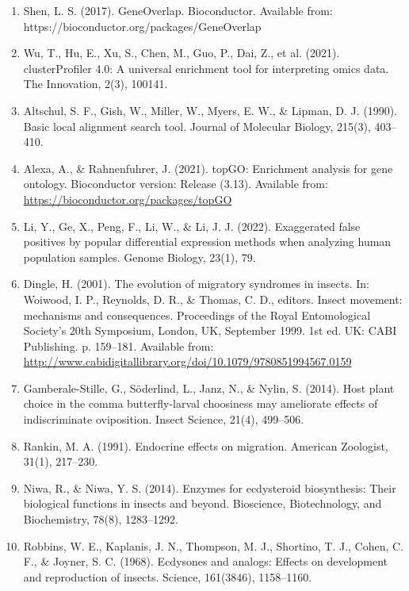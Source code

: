 \documentclass[lineno]{wiley-article}
\begin{document}
\begin{enumerate}
\item Shen, L. S. (2017). GeneOverlap. Bioconductor. Available from: https://bioconductor.org/packages/GeneOverlap

\item Wu, T., Hu, E., Xu, S., Chen, M., Guo, P., Dai, Z., et al. (2021). clusterProfiler 4.0: A universal enrichment tool for interpreting omics data. The Innovation, 2(3), 100141.

\item Altschul, S. F., Gish, W., Miller, W., Myers, E. W., \& Lipman, D. J. (1990). Basic local alignment search tool. Journal of Molecular Biology, 215(3), 403–410.

\item Alexa, A., \& Rahnenfuhrer, J. (2021). topGO: Enrichment analysis for gene ontology. Bioconductor version: Release (3.13). Available from: \url{https://bioconductor.org/packages/topGO}

\item Li, Y., Ge, X., Peng, F., Li, W., \& Li, J. J. (2022). Exaggerated false positives by popular differential expression methods when analyzing human population samples. Genome Biology, 23(1), 79.

\item Dingle, H. (2001). The evolution of migratory syndromes in insects. In: Woiwood, I. P., Reynolds, D. R., \& Thomas, C. D., editors. Insect movement: mechanisms and consequences. Proceedings of the Royal Entomological Society’s 20th Symposium, London, UK, September 1999. 1st ed. UK: CABI Publishing. p. 159–181. Available from: \url{http://www.cabidigitallibrary.org/doi/10.1079/9780851994567.0159}

\item Gamberale-Stille, G., Söderlind, L., Janz, N., \& Nylin, S. (2014). Host plant choice in the comma butterfly-larval choosiness may ameliorate effects of indiscriminate oviposition. Insect Science, 21(4), 499–506.

\item Rankin, M. A. (1991). Endocrine effects on migration. American Zoologist, 31(1), 217–230.

\item Niwa, R., \& Niwa, Y. S. (2014). Enzymes for ecdysteroid biosynthesis: Their biological functions in insects and beyond. Bioscience, Biotechnology, and Biochemistry, 78(8), 1283–1292.

\item Robbins, W. E., Kaplanis, J. N., Thompson, M. J., Shortino, T. J., Cohen, C. F., \& Joyner, S. C. (1968). Ecdysones and analogs: Effects on development and reproduction of insects. Science, 161(3846), 1158–1160.


\end{enumerate}
\end{document}
